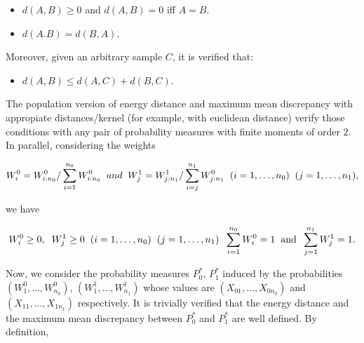\documentclass[11pt]{article}
\begin{document}
\begin{appendices}
\begin{itemize}
	\item $d(A,B)\geq 0$ and $d(A,B)=0$ iff $A=B$. 
	\item $d(A.B)= d(B,A)$.
	\end{itemize}

Moreover, given an arbitrary sample $C$, it is verified that:

\begin{itemize}
	\item $d(A,B)\leq d(A,C)+d(B,C)$.
\end{itemize}


The population version of energy distance and maximum mean discrepancy with appropiate distances/kernel (for example, with euclidean distance) verify those conditions with any pair of probability measures with finite moments of order $2$.  In parallel, considering the weights

\begin{gather}
\begin{align*}
W^{0}_i=W^{0}_{{i:n_0}}/\sum_{i=1}^{n_0} W^{0}_{{i:n_0}} \hspace{0.2cm} and \hspace{0.2cm} W^{1}_j=W^{1}_{{j:n_1}}/\sum_{i=j}^{n_1} W^{0}_{{j:n_1}} \hspace{0.2cm} (i=1,\dots,n_0) \hspace{0.2cm } (j=1,\dots,n_1),
\end{align*}	
\end{gather} 
 
 
we have


\begin{gather}
\begin{align*}
 W^{0}_i\geq 0, \hspace{0.2cm} W^{1}_j	\geq0 \hspace{0.2cm} (i=1,\dots,n_0) \hspace{0.2cm } (j=1,\dots,n_1) \hspace{0.2cm} \sum_{i=1}^{n_0} W^{0}_i=1 \hspace{0.2cm} \text{and} \hspace{0.2cm} \sum_{j=1}^{n_1} W^{1}_j=1.
\end{align*}
\end{gather}


Now, we consider the probability measures $P^{*}_{0}$, $P^{*}_{1}$ induced by the probabilities $(W^{0}_1,\dots, W^{0}_{n_0})$, $(W^{1}_1,\dots, W^{1}_{n_1})$  whose values are  $(X_{01},\dots, X_{0n_{0}})$ and $(X_{11},\dots, X_{1n_1})$ respectively. It is trivially verified that the energy distance and the maximum mean discrepancy between $P^{*}_{0}$ and $P^{*}_1$ are well defined. By definition, 




\end{appendices}
\end{document}
